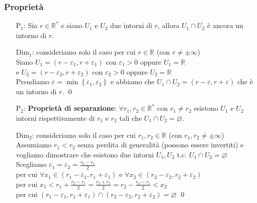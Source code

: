 \documentclass[a4paper]{article}
\begin{document}
\subsubsection*{Proprietà}
\begin{itemize}
	\item[P\(_1\): ] Sia \(r \in \mathbb{R}^*\) e siano \(U_1\) e \(U_2\) due intorni di \(r\), allora \(U_1 \cap U_2\) è ancora un intorno di \(r\).
	\item[Dim\(_1\): ] consideriamo solo il caso per cui \(r \in \mathbb{R}\) (con \(r \neq \pm \infty\)) \\
	Siano \(U_1 = \left( r - \varepsilon_1, r + \varepsilon_1 \right)\) con \(\varepsilon_1 > 0\) oppure \(U_1 = \mathbb{R}\) \\
	e \(U_2 = \left( r - \varepsilon_2, r + \varepsilon_2 \right)\) con \(\varepsilon_2 > 0\) oppure \(U_2 = \mathbb{R}\) \\
	Prendiamo \(\varepsilon = \min \left\{ \varepsilon_1 , \varepsilon_2 \right\}\) e abbiamo che \(U_1 \cap U_2 = \left( r - \varepsilon, r + \varepsilon \right)\) che è un intorno di \(r\). \qed
	
	\item[P\(_2\): ] \textbf{Proprietà di separazione}: \(\forall r_1, r_2 \in \mathbb{R}^*\) con \(r_1 \neq r_2\) esistono \(U_1\) e \(U_2\) intorni
	rispettivamente di \(r_1\) e \(r_2\) tali che \(U_1 \cap U_2 = \varnothing\).
	\item[Dim\(_2\): ] consideriamo solo il caso per cui \(r_1, r_2 \in \mathbb{R}\) (con \(r_1, r_2 \neq \pm \infty\)) \\
	Assumiamo \(r_1 < r_2\) senza perdita di generalità (possono essere invertiti) e vogliamo dimostrare che esistono due intorni \(U_1, U_2\) t.c. \(U_1 \cap U_2 = \varnothing\) \\
	Scegliamo \(\varepsilon_1 = \varepsilon_2 = \displaystyle \frac{r_2 - r_1}{2}\) \\
	per cui \(\forall x_1 \in (r_1 - \varepsilon_1 , r_1 + \varepsilon_1)\) e \(\forall x_2 \in (r_2 - \varepsilon_2 , r_2 + \varepsilon_2)\) \\
	per cui \(x_1 < r_1 + \displaystyle \frac{r_2 - r_1}{2} = \frac{r_2 + r_1}{2} = r_2 - \frac{r_2 - r_1}{2} < x_2\) \\
	per cui \(\left( r_1 - \varepsilon_1, r_1 + \varepsilon_1 \right) \cap \left( r_2 - \varepsilon_2, r_2 + \varepsilon_2 \right) = \varnothing\) \qed
\end{itemize}
\end{document}
